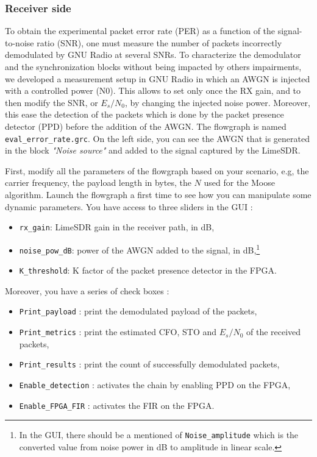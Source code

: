 \subsubsection{Receiver side}

To obtain the experimental packet error rate (PER) as a function of the signal-to-noise ratio (SNR), one must measure the number of packets incorrectly demodulated by GNU Radio at several SNRs. To characterize the demodulator and the synchronization blocks without being impacted by others impairments, we developed a measurement setup in GNU Radio in which an AWGN is injected with a controlled power (N0). This allows to set only once the RX gain, and to then modify the SNR, or $E_s/N_0$, by changing the injected noise power. Moreover, this ease the detection of the packets which is done by the packet presence detector (PPD) before the addition of the AWGN. The flowgraph is named \texttt{eval\_error\_rate.grc}. On the left side, you can see the AWGN that is generated in the block \textit{"Noise source"} and added to the signal captured by the LimeSDR.

First, modify all the parameters of the flowgraph based on your scenario, e.g, the carrier frequency, the payload length in bytes, the $N$ used for the Moose algorithm. Launch the flowgraph a first time to see how you can manipulate some dynamic parameters. You have access to three sliders in the GUI :
\begin{itemize}
    \item \texttt{rx\_gain}: LimeSDR gain  in the receiver path, in dB,
    \item \texttt{noise\_pow\_dB}: power of the AWGN added to the signal, in dB,\footnote[1]{In the GUI, there should be a mentioned of \texttt{Noise\_amplitude} which is the converted value from noise power in dB to amplitude in linear scale.}
    \item \texttt{K\_threshold}: K factor of the packet presence detector in the FPGA.
\end{itemize}

Moreover, you have a series of check boxes :
\begin{itemize}
    \item \texttt{Print\_payload} : print the demodulated payload of the packets,
    \item \texttt{Print\_metrics} : print the estimated CFO, STO and $E_s/N_0$ of the received packets,
    \item \texttt{Print\_results} : print the count of successfully demodulated packets,
    \item \texttt{Enable\_detection} : activates the chain by enabling PPD on the FPGA,
    \item \texttt{Enable\_FPGA\_FIR} : activates the FIR on the FPGA.
\end{itemize}

